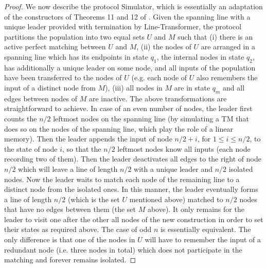 \documentclass[preprint]{elsarticle}
\begin{document}
\begin{proof}
We now describe the protocol Simulator, which is essentially an adaptation of the constructors of Theorems 11 and 12 of \cite{MS14}. Given the spanning line with a unique leader provided with termination by Line-Transformer, the protocol partitions the population into two equal sets $U$ and $M$ such that (i) there is an active perfect matching between $U$ and $M$, (ii) the nodes of $U$ are arranged in a spanning line which has its endpoints in state $q_1$, the internal nodes in state $q_2$, has additionally a unique leader on some node, and all inputs of the population have been transferred to the nodes of $U$ (e.g. each node of $U$ also remembers the input of a distinct node from $M$), (iii) all nodes in $M$ are in state $q_m$ and all edges between nodes of $M$ are inactive. The above transformations are straightforward to achieve. In case of an even number of nodes, the leader first counts the $n/2$ leftmost nodes on the spanning line (by simulating a TM that does so on the nodes of the spanning line, which play the role of a linear memory). Then the leader appends the input of node $n/2+i$, for $1\leq i\leq n/2$, to the state of node $i$, so that the $n/2$ leftmost nodes know all inputs (each node recording two of them). Then the leader deactivates all edges to the right of node $n/2$ which will leave a line of length $n/2$ with a unique leader and $n/2$ isolated nodes. Now the leader waits to match each node of the remaining line to a distinct node from the isolated ones. In this manner, the leader eventually forms a line of length $n/2$ (which is the set $U$ mentioned above) matched to $n/2$ nodes that have no edges between them (the set $M$ above). It only remains for the leader to visit one after the other all nodes of the new construction in order to set their states as required above. The case of odd $n$ is essentially equivalent. The only difference is that one of the nodes in $U$ will have to remember the input of a redundant node (i.e. three nodes in total) which does not participate in the matching and forever remains isolated.



\end{proof}
\end{document}
